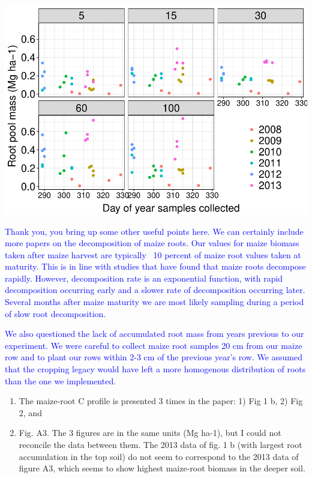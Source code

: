 \documentclass[]{article}
\providecommand{\tightlist}{%
  \setlength{\itemsep}{0pt}\setlength{\parskip}{0pt}}
\begin{document}
\includegraphics{Response_to_reviewers_files/figure-latex/sampling time-1.pdf}

\textcolor{blue}{Thank you, you bring up some other useful points here. We can certainly include more papers on the decomposition of maize roots. Our values for maize biomass taken after maize harvest are typically ~10 percent of maize root values taken at maturity. This is in line with studies that have found that maize roots decompose rapidly. However, decomposition rate is an exponential function, with rapid decomposition occurring early and a slower rate of decomposition occurring later. Several months after maize maturity we are most likely sampling during a period of slow root decomposition.}

\textcolor{blue}{We also questioned the lack of accumulated root mass from years previous to our experiment. We were careful to collect maize root samples 20 cm from our maize row and to plant our rows within 2-3 cm of the previous year's row. We assumed that the cropping legacy would have left a more homogenous distribution of roots than the one we implemented.}

\begin{enumerate}
\def\labelenumi{\arabic{enumi})}
\setcounter{enumi}{1}
\tightlist
\item
  The maize-root C profile is presented 3 times in the paper: 1) Fig 1
  b, 2) Fig 2, and
\item
  Fig. A3. The 3 figures are in the same units (Mg ha-1), but I could
  not reconcile the data between them. The 2013 data of fig. 1 b (with
  largest root accumulation in the top soil) do not seem to correspond
  to the 2013 data of figure A3, which seems to show highest maize-root
  biomass in the deeper soil.
\end{enumerate}
\end{document}
